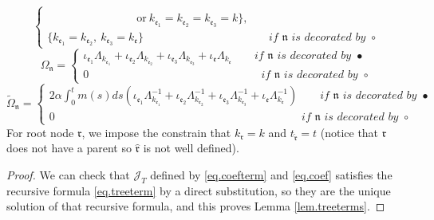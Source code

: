 \begin{lem}
\begin{equation}
\begin{cases}
            \\
            \qquad\qquad\qquad\qquad\text{or}\ k_{\mathfrak{e}_1}= k_{\mathfrak{e}_2}= k_{\mathfrak{e}_3}=k\}, 
            \\
            \{k_{\mathfrak{e}_1}=k_{\mathfrak{e}_2},\ k_{\mathfrak{e}_3}=k_{\mathfrak{e}}\} \qquad\qquad\qquad\qquad\qquad\quad\ \textit{if }\mathfrak{n}\textit{ is decorated by }\circ
        \end{cases}
\end{equation}
\begin{equation}
    \Omega_{\mathfrak{n}}=
        \begin{cases}
            \iota_{\mathfrak{e}_1}\Lambda_{k_{\mathfrak{e}_1}}+\iota_{\mathfrak{e}_2}\Lambda_{k_{\mathfrak{e}_2}}+\iota_{\mathfrak{e}_3}\Lambda_{k_{\mathfrak{e}_3}}+\iota_{\mathfrak{e}}\Lambda_{k_{\mathfrak{e}}} \qquad \textit{if }\mathfrak{n}\textit{ is decorated by }\bullet
            \\
            0 \qquad\qquad\qquad\qquad\qquad\qquad \qquad\quad\ \ \textit{if }\mathfrak{n}\textit{ is decorated by }\circ
        \end{cases}
\end{equation}
\begin{equation}
    \widetilde{\Omega}_{\mathfrak{n}}=
        \begin{cases}
            2\alpha \int^t_{0}m(s) ds\left(\iota_{\mathfrak{e}_1}\Lambda_{k_{\mathfrak{e}_1}}^{-1}+\iota_{\mathfrak{e}_2}\Lambda_{k_{\mathfrak{e}_2}}^{-1}+\iota_{\mathfrak{e}_3}\Lambda_{k_{\mathfrak{e}_3}}^{-1}+\iota_{\mathfrak{e}}\Lambda_{k_{\mathfrak{e}}}^{-1}\right) \qquad \textit{if }\mathfrak{n}\textit{ is decorated by }\bullet
            \\
            0 \qquad\qquad\qquad\qquad\qquad\qquad\qquad\qquad\qquad\qquad\quad\ \ \ \ \  \textit{if }\mathfrak{n}\textit{ is decorated by }\circ
        \end{cases}
\end{equation}
For root node $\mathfrak{r}$, we impose the constrain that $k_{\mathfrak{r}}=k$ and $t_{\widehat{\mathfrak{r}}}=t$ (notice that $\mathfrak{r}$ does not have a parent so $\widehat{\mathfrak{r}}$ is not well defined). 
\end{lem}


\begin{proof}
We can check that $\mathcal{J}_T$ defined by \eqref{eq.coefterm} and \eqref{eq.coef} satisfies the recursive formula \eqref{eq.treeterm} by a direct substitution, so they are the unique solution of that recursive formula, and this proves Lemma \ref{lem.treeterms}.
\end{proof}


